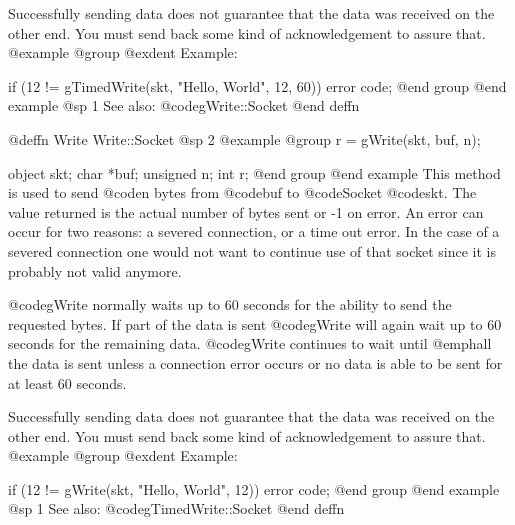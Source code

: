 Successfully sending data does not guarantee that the data was received
on the other end.  You must send back some kind of acknowledgement to
assure that.
@example
@group
@exdent Example:
 
if (12 != gTimedWrite(skt, "Hello, World", 12, 60))
        error code;
@end group
@end example
@sp 1
See also:  @code{gWrite::Socket}
@end deffn















@deffn {Write} Write::Socket
@sp 2
@example
@group
r = gWrite(skt, buf, n);

object   skt;
char     *buf;
unsigned n;
int      r;
@end group
@end example
This method is used to send @code{n} bytes from @code{buf} to
@code{Socket} @code{skt}.  The value returned is the actual number
of bytes sent or -1 on error.  An error can occur for two reasons:
a severed connection, or a time out error.  In the case of a severed
connection one would not want to continue use of that socket since
it is probably not valid anymore.

@code{gWrite} normally waits up to 60 seconds for the ability to send the
requested bytes.  If part of the data is sent @code{gWrite} will again
wait up to 60 seconds for the remaining data.  @code{gWrite} continues to
wait until @emph{all} the data is sent unless a connection error occurs
or no data is able to be sent for at least 60 seconds.

Successfully sending data does not guarantee that the data was received
on the other end.  You must send back some kind of acknowledgement to
assure that.
@example
@group
@exdent Example:
 
if (12 != gWrite(skt, "Hello, World", 12))
        error code;
@end group
@end example
@sp 1
See also:  @code{gTimedWrite::Socket}
@end deffn









